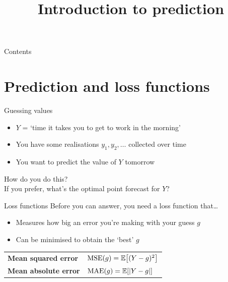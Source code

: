 

\title{Introduction to prediction}



\maketitle

\begin{frame}{Contents}
    \tableofcontents[hideallsubsections]
\end{frame}

\section{Prediction and loss functions}

\begin{frame}{Guessing values}
    \begin{itemize}
        \item $Y$ = `time it takes you to get to work in the morning'
        \item You have some realisations $y_{1}, y_{2}, \ldots$ collected over
              time
        \item You want to predict the value of $Y$ tomorrow
    \end{itemize}
    \vfill\pause
    \begin{center}
        {\Large%
         How do you do this?} \\[1em]
        {If you prefer, what's the \alert{optimal point forecast} for $Y$?}
    \end{center}
\end{frame}

\begin{frame}{Loss functions}
    Before you can answer, you need a \alert{loss function} that\ldots
    \begin{itemize}
        \item Measures how big an error you're making with your guess $g$
        \item Can be minimised to obtain the `best' $g$
    \end{itemize}
    \vfill\pause
    \begin{center}
        \renewcommand*{\arraystretch}{1.5}
        \begin{tabular}{ll}
            \toprule
            \textbf{Mean squared error}  & $\operatorname{MSE}(g) = \mathbb{E}\!\left[  (Y - g)^{2} \right]$ \\
            \textbf{Mean absolute error} & $\operatorname{MAE}(g) = \mathbb{E}\!\left[  |Y - g| \right]$ \\
            \bottomrule
        \end{tabular}
    \end{center}
\end{frame}

